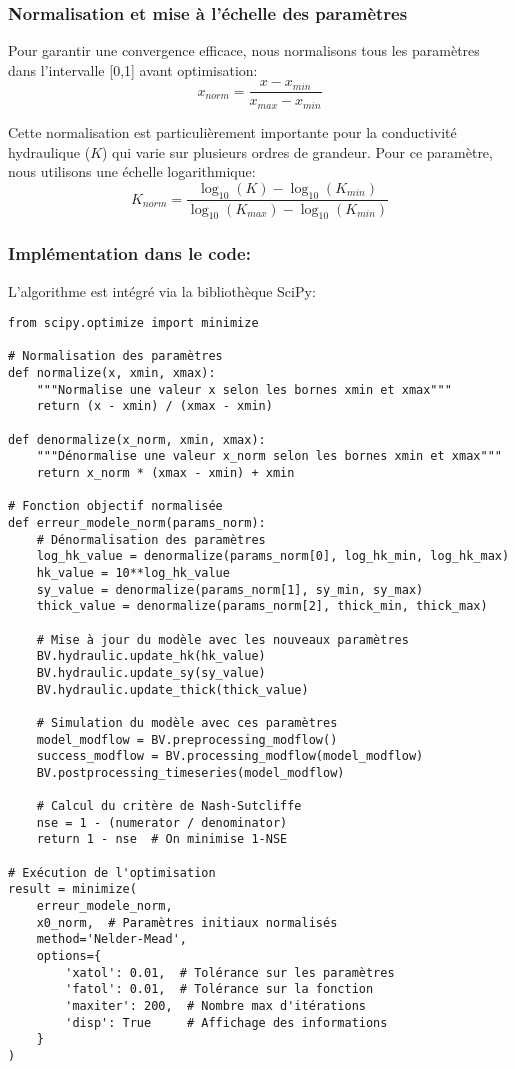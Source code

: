 \subsubsection{Normalisation et mise à l'échelle des paramètres}

Pour garantir une convergence efficace, nous normalisons tous les paramètres dans l'intervalle [0,1] avant optimisation:
\begin{equation}
x_{norm} = \frac{x - x_{min}}{x_{max} - x_{min}}
\end{equation}

Cette normalisation est particulièrement importante pour la conductivité hydraulique ($K$) qui varie sur plusieurs ordres de grandeur. Pour ce paramètre, nous utilisons une échelle logarithmique:
\begin{equation}
K_{norm} = \frac{\log_{10}(K) - \log_{10}(K_{min})}{\log_{10}(K_{max}) - \log_{10}(K_{min})}
\end{equation}


\subsubsection{Implémentation dans le code:}

L'algorithme est intégré via la bibliothèque SciPy:

\begin{verbatim}
from scipy.optimize import minimize

# Normalisation des paramètres
def normalize(x, xmin, xmax):
    """Normalise une valeur x selon les bornes xmin et xmax"""
    return (x - xmin) / (xmax - xmin)

def denormalize(x_norm, xmin, xmax):
    """Dénormalise une valeur x_norm selon les bornes xmin et xmax"""
    return x_norm * (xmax - xmin) + xmin

# Fonction objectif normalisée
def erreur_modele_norm(params_norm):
    # Dénormalisation des paramètres
    log_hk_value = denormalize(params_norm[0], log_hk_min, log_hk_max)
    hk_value = 10**log_hk_value
    sy_value = denormalize(params_norm[1], sy_min, sy_max)
    thick_value = denormalize(params_norm[2], thick_min, thick_max)
    
    # Mise à jour du modèle avec les nouveaux paramètres
    BV.hydraulic.update_hk(hk_value)
    BV.hydraulic.update_sy(sy_value)
    BV.hydraulic.update_thick(thick_value)
    
    # Simulation du modèle avec ces paramètres
    model_modflow = BV.preprocessing_modflow()
    success_modflow = BV.processing_modflow(model_modflow)
    BV.postprocessing_timeseries(model_modflow)
    
    # Calcul du critère de Nash-Sutcliffe
    nse = 1 - (numerator / denominator) 
    return 1 - nse  # On minimise 1-NSE

# Exécution de l'optimisation
result = minimize(
    erreur_modele_norm, 
    x0_norm,  # Paramètres initiaux normalisés
    method='Nelder-Mead',
    options={
        'xatol': 0.01,  # Tolérance sur les paramètres
        'fatol': 0.01,  # Tolérance sur la fonction
        'maxiter': 200,  # Nombre max d'itérations
        'disp': True     # Affichage des informations
    }
)
\end{verbatim}

